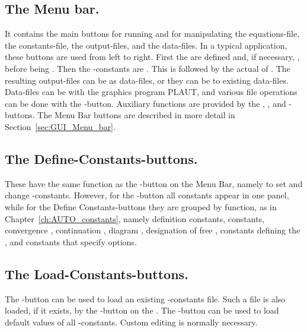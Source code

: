 \subsection{ The Menu bar.}
It contains the main buttons for running \AUTO
and for manipulating the equations-file, the constants-file,
the output-files, and the data-files.
In a typical application, these buttons are used from left to right.
First the  are defined and, if necessary, ,
before being .
Then the \AUTO-constants are .
This is followed by the actual  of \AUTO.
The resulting output-files can be  as data-files,
or they can be  to existing data-files.
Data-files can be  with the graphics program {\cal PLAUT},
and various file operations can be done with the -button.
Auxiliary functions are provided by the , ,
and -buttons.
The Menu Bar buttons are described in more detail 
in Section~\ref{sec:GUI_Menu_bar}.


\subsection{ The Define-Constants-buttons.}
These have the same function as
the -button on the  Menu Bar, namely to set and change
\AUTO-constants.
However, 
for the -button all constants appear in one panel, 
while 
for the Define Constants-buttons they
are grouped by function, 
as in Chapter~\ref{ch:AUTO_constants}, namely
 definition constants,
 constants,
convergence ,
continuation ,
diagram ,
designation of free ,
constants defining the ,
and
constants that specify  options.


\subsection{ The Load-Constants-buttons.}
The -button can be used to load an existing \AUTO-constants file.
Such a file is also loaded, if it exists,
by the -button on the .
The -button can be used
to load  default values of all \AUTO-constants. 
Custom editing is normally necessary.


